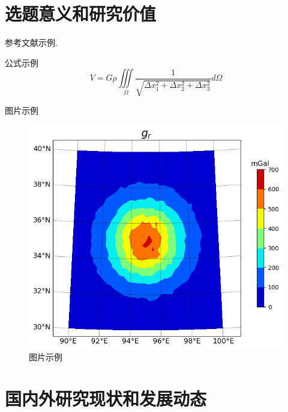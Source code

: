 \documentclass[a4paper,12pt]{CSUResearchProposal}
\begin{document}
\author{XXX}

\ReviewerOne{ }{ }{ }
\ReviewerTwo{ }{}{ }
\ReviewerThree{ }{ }{ }
\ReviewerFour{ }{ }{ }
\ReviewerFive{ }{ }{ }
\ReviewerSix{ }{ }{ }

\Secretary{ }{ }{ }
\maketitle



\section{选题意义和研究价值}
\label{sec:background}
参考文献示例\citep{han2024cancer}.

公式示例
\begin{equation}\label{equ:potential}
V = G\rho \iiint\limits_\Omega  {\frac{1}{{\sqrt {\Delta x_1^2 + \Delta x_2^2 + \Delta x_3^2} }}d\Omega }
\end{equation}

图片示例
\begin{figure}[H]
	\centering
	\includegraphics[width=0.6\linewidth]{figures/gr}
	\caption{图片示例}
	\label{fig:gr}
\end{figure}


\newpage
  
\section{国内外研究现状和发展动态}
\label{sec:current_state}

\newpage
\end{document}

